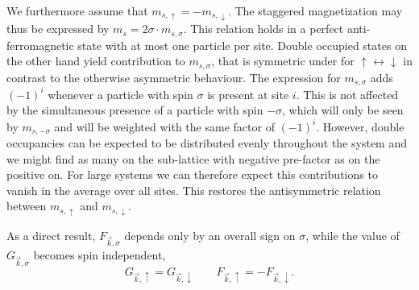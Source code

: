 We furthermore assume that $m_{s,\uparrow}=-m_{s,\downarrow}$. 
The staggered magnetization may thus be expressed by $m_s=2\sigma \cdot m_{s,\sigma}$.
This relation holds in a perfect anti-ferromagnetic state with at most one particle per site. 
Double occupied states on the other hand yield  contribution to $m_{s,\sigma}$, that is symmetric under for $\uparrow \leftrightarrow \downarrow$ in contrast to the 
otherwise asymmetric behaviour.
The expression for $m_{s,\sigma}$ adds $(-1)^i$  whenever a particle with spin $\sigma$ is present at site $i$. 
This is not affected by the simultaneous presence of a particle with spin $-\sigma$, 
which will only be seen by $m_{s,-\sigma}$ and will be weighted with the same factor of $(-1)^i$.
However, double occupancies can be expected to be distributed evenly throughout the system
and we might find as many on the sub-lattice with negative pre-factor as on the positive on.
For large systems we can therefore expect this contributions to vanish in the average over all sites.
This restores the antisymmetric relation between $m_{s,\uparrow}$ and $m_{s,\downarrow}$. 

As a direct result, $F_{\vec k,\sigma}$ depends only by an overall sign on $\sigma$, while the value of $G_{\vec k,\sigma}$ becomes spin independent,
\begin{equation}
 G_{\vec k,\uparrow} = G_{\vec k,\downarrow} \qquad F_{\vec k,\uparrow} =-F_{\vec k,\downarrow}.
\end{equation}




